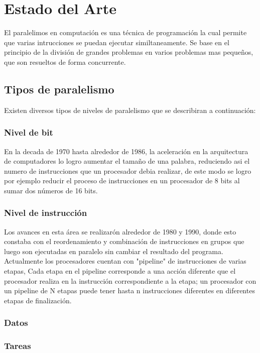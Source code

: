 \chapter[Estado del Arte]{\label{ch:estado-arte}Estado del Arte}

El paralelimos en computación es una técnica de programación la cual permite que varias intrucciones se puedan ejecutar similtaneamente. Se base en el principio de la división de grandes problemas en varios problemas mas pequeños, que son resueltos de forma concurrente.
\\
\section{\label{sec:des-intro}Tipos de paralelismo}
Existen diversos tipos de niveles de paralelismo que se describiran a continuación:
\subsection{Nivel de bit}
En la decada de 1970 hasta alrededor de 1986, la aceleración en la arquitectura de computadores lo logro aumentar el tamaño de una palabra, reduciendo asi el numero de instrucciones que un procesador debia realizar, de este modo se logro por ejemplo reducir el proceso de instrucciones en un procesador de 8 bits al sumar dos números de 16 bits.

\subsection{Nivel de instrucción}
Los avances en esta área se realizarón alrededor de 1980 y 1990, donde esto constaba con el reordenamiento y combinación de instrucciones en grupos que luego son ejecutadas en paralelo sin cambiar el resultado del programa. Actualmente los procesadores cuentan con "pipeline" de instrucciones de varias etapas, Cada etapa en el pipeline corresponde a una acción diferente que el procesador realiza en la instrucción correspondiente a la etapa; un procesador con un pipeline de N etapas puede tener hasta n instrucciones diferentes en diferentes etapas de finalización.
\subsection{Datos}
\subsection{Tareas}